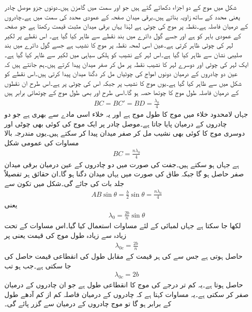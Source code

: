 شکل  میں  موج کے دو  اجزاء دکھائے گئے ہیں جو  اور  سمت میں گامزن ہیں۔دونوں جزو موصل چادر یعنی  محدد کے ساتھ  زاویہ بناتے ہیں۔برقی میدان صفحہ کے عمودی  محدد کی سمت میں ہے۔چادروں کے درمیان فاصلہ  ہے۔نقطہ  پر موج  کی چوٹی ہے لہٰذا یہاں برقی میدان  مثبت  قیمت رکھتا ہے جو صفحہ کے عمودی باہر کو ہے اور جسے گول دائرے میں بند نقطے سے ظاہر کیا گیا ہے۔ اس نقطے پر لکیر  لہر کی چوٹی ظاہر کرتی ہے۔عین اسی لمحہ نقطہ  پر موج  کا نشیب ہے جسے گول دائرے میں بند صلیبی نشان سے ظاہر کیا گیا ہے۔اس لہر کے نشیب کو ہلکی سیاہی میں لکیر  سے ظاہر کیا گیا ہے۔ایک لہر کی چوٹی اور دوسرے لہر کا نشیب نقطہ  پر مل کر صفر میدان پیدا کرتے ہیں۔ہم جانتے ہیں کہ عین دو چادروں کے درمیان دونوں امواج کی چوٹیاں مل کر دگنا میدان پیدا کرتی ہیں۔اس نقطے کو شکل میں  سے ظاہر کیا گیا ہے۔یوں موج  کا نشیب  پر جبکہ اس کی چوٹی  پر ہے۔اس طرح ان نقطوں کے درمیان فاصلہ طول موج کا چوتھا حصہ ہو گا۔اسی طرح  اور  بھی طول موج کے چوتھائی برابر  ہیں
\begin{align}
BC=BC'=BD=\frac{\lambda_0}{4}
\end{align}
جہاں لامحدود خلاء میں  موج کا طول موج  ہے اور یہ خلاء اسی مادے سے بھری ہے جو دو چادروں کے درمیان پایا جاتا ہے۔موصل چادر پر ایک موج کی کوئی بھی چوٹی اور دوسری موج کا کوئی بھی نشیب مل کر صفر میدان پیدا کر سکتے ہیں۔یوں مندرجہ بالا مساوات کی عمومی شکل
\begin{align}\label{مساوات_مویج_چوٹی_نشیب_ختم_عمومی}
BC=\frac{n \lambda_0}{4}
\end{align}
ہے جہاں  ہو سکتے ہیں۔جفت  کی صورت میں دو چادروں کے عین درمیان برقی میدان صفر حاصل ہو گا جبکہ طاق  کی صورت میں یہاں میدان دگنا ہو گا۔ان حقائق ہر تفصیلاً جلد بات کی جائے گی۔شکل  میں تکون  سے
\begin{align*}
AB \sin \theta = \frac{b}{2}\sin \theta =\frac{n \lambda_0}{4}
\end{align*}
یعنی
\begin{align}\label{مساوات_مویج_طول_اور_درجہ_انداز}
\lambda_0 = \frac{2b}{n} \sin \theta
\end{align}
لکھا جا سکتا ہے جہاں لمبائی  کے لئے مساوات  استعمال کیا گیا۔اس مساوات کے تحت زیادہ سے زیادہ طول موج  کی قیمت  یعنی  پر
\begin{align}\label{مساوات_مویج_طول_موج_بالمقابل_درجہ_موج}
\lambda_{0c}=\frac{2b}{n}
\end{align}
 حاصل ہوتی ہے جس سے  کی ہر قیمت کے مقابل طول کی انقطاعی قیمت حاصل کی جا سکتی ہے۔جب  ہو تب
 \begin{align}
\lambda_{0c}=2b
\end{align}
حاصل ہوتا ہے۔یہ کم تر درجے کی  موج کا انقطاعی طول ہے جو ان چادروں کے درمیان صفر کر سکتی ہے۔یہ مساوات کہتا ہے کہ چادروں کے درمیان فاصلہ کم از کم آدھے طول کے برابر ہو گا تو موج چادروں کے درمیان سے گزر پائے گی۔

